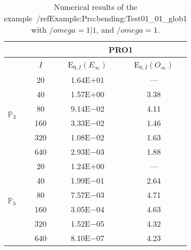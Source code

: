 \begin{table}[H]
\caption{Numerical results of the example~/ref{Example:Pro:bending:Test01_01_glob1} with $/omega=1|1$, and $/omega=1$.}
\setlength{\tabcolsep}{5pt}
\centering
\begin{tabular}{@{}l c c c@{}}
\toprule
 &  & \multicolumn{2}{c}{PRO1}\\
\midrule
 & $I$ & E$_{0,I}(E_{\infty})$ & E$_{0,I}(O_{\infty})$\\
\midrule
\multirow{6}{*}{$\mathbb{P}_{3}$}
 & 20 & 1.64E$+$01 & ---\\
 & 40 & 1.57E$+$00 & 3.38\\
 & 80 & 9.14E$-$02 & 4.11\\
 & 160 & 3.33E$-$02 & 1.46\\
 & 320 & 1.08E$-$02 & 1.63\\
 & 640 & 2.93E$-$03 & 1.88\\
\midrule
\multirow{6}{*}{$\mathbb{P}_{5}$}
 & 20 & 1.24E$+$00 & ---\\
 & 40 & 1.99E$-$01 & 2.64\\
 & 80 & 7.57E$-$03 & 4.71\\
 & 160 & 3.05E$-$04 & 4.63\\
 & 320 & 1.52E$-$05 & 4.32\\
 & 640 & 8.10E$-$07 & 4.23\\
\bottomrule
\end{tabular}
\label{Table:PRO:test_01_01_test25_pro1}
\end{table}
